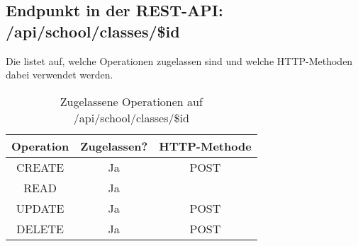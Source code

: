 \subsection{Endpunkt in der REST-API: /api/school/classes/\$id}
Die  listet auf, welche Operationen zugelassen sind und welche HTTP-Methoden dabei verwendet werden. 

\begin{table}[!htbp]
	\begin{tabular}{|c|c|c|}
		\hline
			\textbf{Operation} & \textbf{Zugelassen?} & \textbf{HTTP-Methode} \\ \hline
			CREATE & Ja & POST \\ \hline 
			READ & Ja &  \\ \hline
			UPDATE & Ja & POST \\ \hline 
			DELETE & Ja & POST \\ \hline
	\end{tabular}

		\caption{Zugelassene Operationen auf /api/school/classes/\$id}
		\label{tab:end:rest:api:school:classes:id:meth}
\end{table}